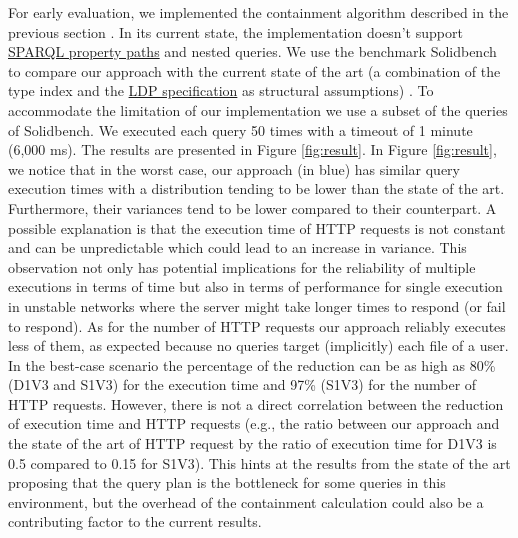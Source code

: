 For early evaluation, we implemented the containment algorithm described in the previous section .
In its current state, the implementation doesn't support 
\href{https://www.w3.org/TR/sparql11-query/#propertypaths}{SPARQL property paths} and nested queries.
We use the benchmark Solidbench \cite{Taelman2023} to compare our approach with the current state of the art 
(a combination of the type index and the \href{https://www.w3.org/TR/ldp/}{LDP specification} as structural assumptions) \cite{Taelman2023}.
To accommodate the limitation of our implementation we use a subset of the queries of Solidbench.
We executed each query 50 times with a timeout of 1 minute (6,000 ms).
The results are presented in Figure \ref{fig:result}.
In Figure \ref{fig:result}, we notice that in the worst case, our approach (in blue) has similar query execution times with a 
distribution tending to be lower than the state of the art.
Furthermore, their variances tend to be lower compared to their counterpart. 
A possible explanation is that the execution time of HTTP requests is not constant and can be unpredictable \cite{hartig2016walking}
which could lead to an increase in variance.
This observation not only has potential implications for the reliability of multiple executions in terms of time
but also in terms of performance for single execution in unstable networks where the server might take longer times to respond (or fail to respond). 
As for the number of HTTP requests our approach reliably executes less of them, as expected because no
queries target (implicitly) each file of a user.
In the best-case scenario the percentage of the reduction can be as high as 80\% (D1V3 and S1V3) for the execution time 
and 97\% (S1V3) for the number of HTTP requests.
However, there is not a direct correlation between the reduction of execution time and HTTP requests (e.g., the ratio 
between our approach and the state of the art of HTTP request by the ratio of execution time for D1V3 is 0.5 compared to 0.15 for S1V3).
This hints at the results from the state of the art \cite{Taelman2023} proposing that the query plan is the bottleneck for some queries in this environment,
but the overhead of the containment calculation could also be a contributing factor to the current results.

  